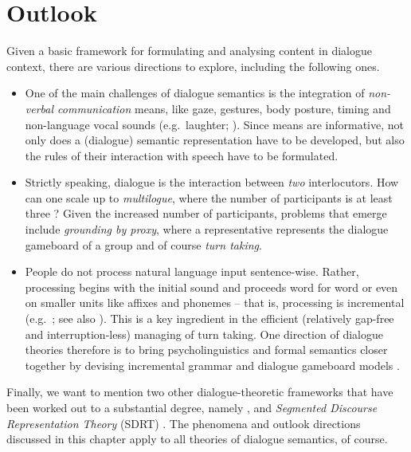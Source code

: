 \documentclass[output=paper
 	        ,biblatex
                ,babelshorthands
                ,newtxmath
                ,draftmode
                ,colorlinks, citecolor=brown
]{langscibook}
\begin{document}
\section{Outlook}
\label{sec:outlook-dialogue}

Given a basic framework for formulating and analysing content in dialogue context, there are various directions to explore, including the following ones.

\begin{itemize}
    \item 
One of the main challenges of dialogue semantics is the integration of \emph{non-verbal communication} means, like gaze, gestures, body posture, timing and non-language  vocal sounds (e.g.\ laughter; \citealt{Ginzburg:Breitholz:Cooper:Hough:Tian:2015,Tian:Mazzocconi:Ginzburg:2016}).
%
Since  means are informative, not only does a (dialogue) semantic representation have to be developed, but also the rules of their interaction with speech have to be formulated. 

\item Strictly speaking, dialogue is the interaction between \emph{two} interlocutors.
%
How can one scale up to \emph{multilogue}, where the number of participants is at least three \citep{Ginzburg:Fernandez:2005}?
%
Given the increased number of participants,  problems that emerge include  \emph{grounding by proxy},  where a representative represents the dialogue gameboard of a group \citep{Eshghi:Healey:2016} and of course \emph{turn taking}.

\item People do not process natural language input sentence-wise.
%
Rather, processing begins with the initial sound and proceeds word for word or even on smaller units like affixes and phonemes -- that is, processing is incremental   (e.g.\ \citealt{Sedivy:Tanenhaus:Chambers:Carlson:1999}; see also ). This is a key ingredient in the efficient (relatively gap-free and interruption-less) managing of turn taking.
%
One direction of dialogue theories therefore is to bring psycholinguistics and formal semantics closer together by devising incremental grammar and dialogue gameboard models \citep{Hough:Kennington:Schlangen:Ginzburg:2015,Demberg:Keller:Koller:2013,Poesio:Rieser:2011}.

\end{itemize}


Finally, we want to mention two other dialogue-theoretic frameworks that have been worked out to a substantial degree, namely  \citep{Traum:1994,Poesio:1995,Poesio:Traum:1997,Poesio:Rieser:2010}, and \emph{Segmented Discourse Representation Theory}  (SDRT) \citep{Asher:1993,Asher:Lascarides:2003,Asher:Lascarides:2013,Hunter:Asher:2015}.
%
The phenomena and outlook directions discussed in this chapter apply to all theories of dialogue semantics, of course. 
\end{document}

